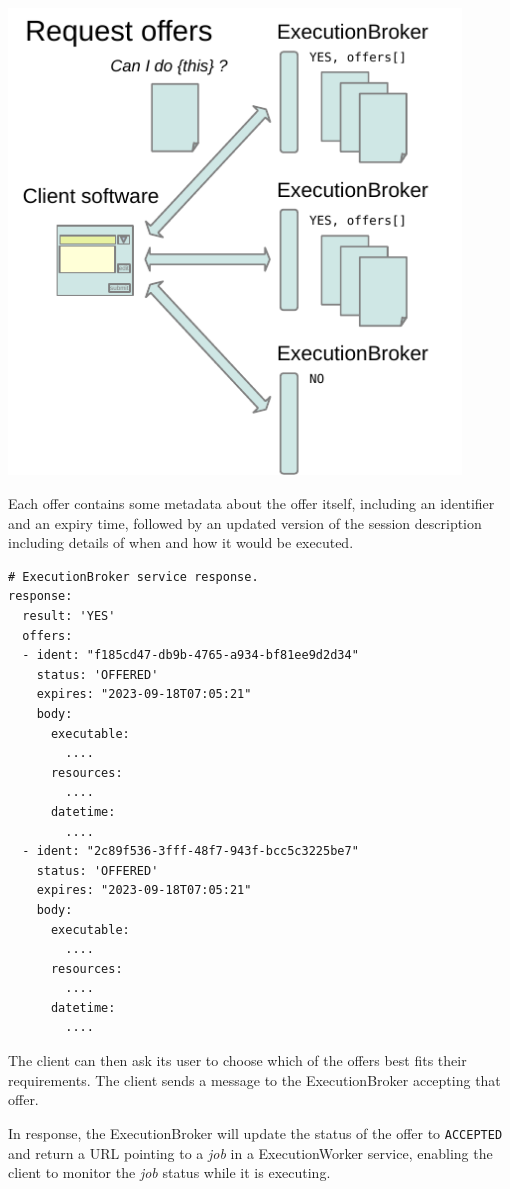 \documentclass[11pt,a4paper]{ivoa}
\newcommand{\execbrokerclass} {ExecutionBroker}
\newcommand{\execworkerclass} {ExecutionWorker}
\newcommand{\codeword}[1] {\texttt{#1}}
\newcommand{\workerjob} {\textit{job}}
\begin{document}

\includegraphics[width=0.9\textwidth]{diagrams/request-offers.pdf}

Each offer contains some metadata about the offer itself,
including an identifier and an expiry time,
followed by an updated version of the session description
including details of when and how it would be executed.

\begin{lstlisting}[]
# ExecutionBroker service response.
response:
  result: 'YES'
  offers:
  - ident: "f185cd47-db9b-4765-a934-bf81ee9d2d34"
    status: 'OFFERED'
    expires: "2023-09-18T07:05:21"
    body:
      executable:
        ....
      resources:
        ....
      datetime:
        ....
  - ident: "2c89f536-3fff-48f7-943f-bcc5c3225be7"
    status: 'OFFERED'
    expires: "2023-09-18T07:05:21"
    body:
      executable:
        ....
      resources:
        ....
      datetime:
        ....
\end{lstlisting}

The client can then ask its user to choose which of the offers best fits their requirements.
The client sends a message to the \execbrokerclass{} accepting that offer.

In response, the \execbrokerclass{} will update the status of the offer to \codeword{ACCEPTED} and return a URL
pointing to a \workerjob{} in a \execworkerclass{} service, enabling the client to monitor the \workerjob{}
status while it is executing.
\end{document}
